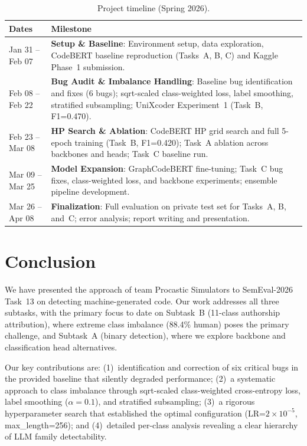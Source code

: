 \documentclass[11pt]{article}
\begin{document}
\begin{table}[ht]
\centering
\small
\begin{tabularx}{\columnwidth}{@{}l X@{}}
\toprule
\textbf{Dates} & \textbf{Milestone} \\ \midrule
Jan 31 -- Feb 07 & \textbf{Setup \& Baseline}: Environment setup, data exploration, CodeBERT baseline reproduction (Tasks~A, B, C) and Kaggle Phase~1 submission. \\ \addlinespace[0.5ex]
Feb 08 -- Feb 22 & \textbf{Bug Audit \& Imbalance Handling}: Baseline bug identification and fixes (6 bugs); sqrt-scaled class-weighted loss, label smoothing, stratified subsampling; UniXcoder Experiment~1 (Task~B, F1=0.470). \\ \addlinespace[0.5ex]
Feb 23 -- Mar 08 & \textbf{HP Search \& Ablation}: CodeBERT HP grid search and full 5-epoch training (Task~B, F1=0.420); Task~A ablation across backbones and heads; Task~C baseline run. \\ \addlinespace[0.5ex]
Mar 09 -- Mar 25 & \textbf{Model Expansion}: GraphCodeBERT fine-tuning; Task~C bug fixes, class-weighted loss, and backbone experiments; ensemble pipeline development. \\ \addlinespace[0.5ex]
Mar 26 -- Apr 08 & \textbf{Finalization}: Full evaluation on private test set for Tasks~A, B, and~C; error analysis; report writing and presentation. \\ \bottomrule
\end{tabularx}
\caption{Project timeline (Spring 2026).}
\label{tab:timeline}
\end{table}

\section{Conclusion}
\label{sec:conclusion}

We have presented the approach of team Procastic Simulators to SemEval-2026 Task~13 on detecting machine-generated code. Our work addresses all three subtasks, with the primary focus to date on Subtask~B (11-class authorship attribution), where extreme class imbalance (88.4\% human) poses the primary challenge, and Subtask~A (binary detection), where we explore backbone and classification head alternatives.

Our key contributions are: (1)~identification and correction of six critical bugs in the provided baseline that silently degraded performance; (2)~a systematic approach to class imbalance through sqrt-scaled class-weighted cross-entropy loss, label smoothing ($\alpha = 0.1$), and stratified subsampling; (3)~a rigorous hyperparameter search that established the optimal configuration (LR=$2{\times}10^{-5}$, max\_length=256); and (4)~detailed per-class analysis revealing a clear hierarchy of LLM family detectability.
\end{document}

